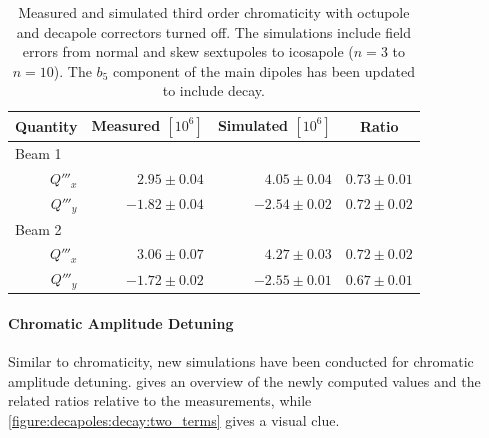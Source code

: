 \begin{table}[!htb]
    \centering
    \begin{tabular}{rrrr}
      \toprule
      Quantity     &  Measured $[10^6]$        &  Simulated $[10^{6}]$          &   \multicolumn{1}{c}{Ratio}     \\
      \midrule
        \multicolumn{1}{l}{Beam 1}    &                             &                                &             \\
                $Q'''_x$ &       $ 2.95 \pm 0.04$      & $ 4.05 \pm 0.04$               &  $0.73 \pm 0.01$  \\
                $Q'''_y$ &       $-1.82 \pm 0.04$      & $-2.54 \pm 0.02$               &  $0.72 \pm 0.02$  \\
        \multicolumn{1}{l}{Beam 2}    &                             &                                &             \\
                $Q'''_x$ &       $ 3.06 \pm 0.07$      & $ 4.27 \pm 0.03$               &  $0.72 \pm 0.02$  \\
                $Q'''_y$ &       $-1.72 \pm 0.02$      & $-2.55 \pm 0.01$               &  $0.67 \pm 0.01$ \\
      \bottomrule
    \end{tabular}
    \caption{Measured and simulated third order chromaticity with octupole and decapole correctors
    turned off. The simulations include field errors from normal and skew sextupoles to icosapole
    ($n=3$ to $n=10$). The $b_5$ component of the main dipoles has been updated to include decay.}
    \label{table:decapoles:decay:virgin_dq3_recompare}
\end{table}




\paragraph{Chromatic Amplitude Detuning}

Similar to chromaticity, new simulations have been conducted for chromatic amplitude detuning.
 gives an overview of the newly computed values and 
the related ratios relative to the measurements, while \cref{figure:decapoles:decay:two_terms} gives
a visual clue.

